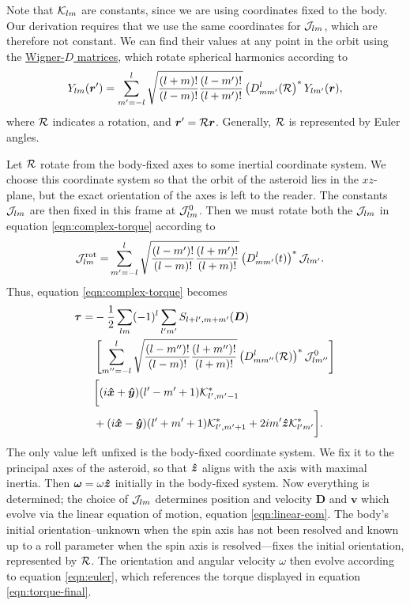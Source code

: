\documentclass[aps,twocolumn,secnumarabic,balancelastpage,amsmath,amssymb,nofootinbib,floatfix]{revtex4-1}
\begin{document}
Note that $\mathcal{K}_{lm}$ are constants, since we are using coordinates fixed to the body. Our derivation requires that we use the same coordinates for $\mathcal{J}_{lm}$, which are therefore not constant. We can find their values at any point in the orbit using the \href{https://en.wikipedia.org/wiki/Wigner_D-matrix#Relation_to_spherical_harmonics_and_Legendre_polynomials}{Wigner-$D$ matrices}, which rotate spherical harmonics according to
$$Y_{lm}(\bm r') = \sum_{m'=-l}^l\sqrt{\frac{(l+m)!}{(l-m)!}\frac{(l-m')!}{(l+m')!}}\left( D^l_{mm'}(\mathcal{R} \right)^*Y_{lm'}(\bm r),$$
where $\mathcal{R}$ indicates a rotation, and $\bm r' = \mathcal{R} \bm r$. Generally, $\mathcal{R}$ is represented by Euler angles.

Let $\mathcal{R}$ rotate from the body-fixed axes to some inertial coordinate system. We choose this coordinate system so that the orbit of the asteroid lies in the $xz$-plane, but the exact orientation of the axes is left to the reader. The constants $\mathcal{J}_{lm}$ are then fixed in this frame at $\mathcal{J}_{lm}^0$. Then we must rotate both the $\mathcal{J}_{lm}$ in equation \ref{eqn:complex-torque} according to
\begin{equation*}
\begin{aligned}
\mathcal{J}^\text{rot}_{lm} =&\sum_{m'=-l}^l\sqrt{\frac{(l-m')!}{(l-m)!}\frac{(l+m')!}{(l+m)!}}\left( D^l_{mm'}(t) \right)^*\mathcal{J}_{lm'}.
\end{aligned}
\end{equation*}
Thus, equation \ref{eqn:complex-torque} becomes
\begin{equation*}
\begin{aligned}
\bm \tau = &-\frac{1}{2}\sum_{lm}(-1)^l\sum_{l'm'}S_{l+l',m+m'}(\bm D)\\
&\left[ \sum_{m''=-l}^l\sqrt{\frac{(l-m'')!}{(l-m)!}\frac{(l+m'')!}{(l+m)!}}\left( D^l_{mm''}(\mathcal{R}) \right)^*\mathcal{J}_{lm''}^0 \right]\\
&\bigg[(i\bm{\hat x} + \bm{\hat y})(l'-m'+1)\mathcal{K}^*_{l',m'-1}\\
&+(i\bm{\hat x}-\bm{\hat y})(l'+m'+1)\mathcal{K}^*_{l',m'+1}+2im'\bm{\hat z} \mathcal{K}^*_{l'm'}\bigg].
\label{eqn:torque-final}
\end{aligned}
\end{equation*}
The only value left unfixed is the body-fixed coordinate system. We fix it to the principal axes of the asteroid, so that $\bm{\hat z}$ aligns with the axis with maximal inertia. Then $\bm\omega = \omega \bm{\hat z}$ initially in the body-fixed system. Now everything is determined; the choice of $\mathcal{J}_{lm}$ determines position and velocity $\bm D$ and $\bm v$ which evolve via the linear equation of motion, equation \ref{eqn:linear-eom}. The body's initial orientation--unknown when the spin axis has not been resolved and known up to a roll parameter when the spin axis is resolved---fixes the initial orientation, represented by $\mathcal{R}$. The orientation and angular velocity $\omega$ then evolve according to equation \ref{eqn:euler}, which references the torque displayed in equation \ref{eqn:torque-final}.
\end{document}

